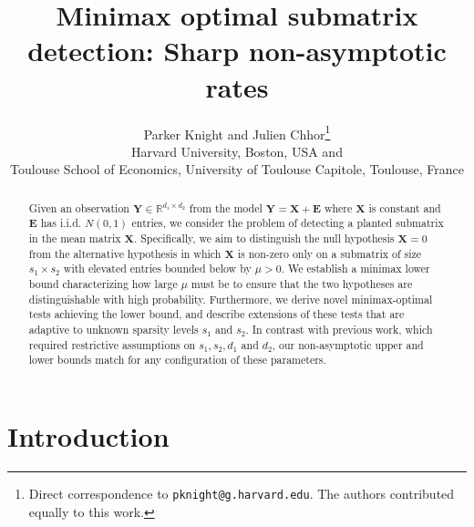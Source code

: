 \documentclass{article}
\title{Minimax optimal submatrix detection: Sharp non-asymptotic rates}
\author{%
  Parker Knight and Julien Chhor\footnote{Direct correspondence to \texttt{pknight@g.harvard.edu}. The authors contributed equally to this work.}  \\
Harvard University, Boston, USA and \\ Toulouse School of Economics, University of Toulouse Capitole, Toulouse, France
}
\newcommand{\R}{\mathbb{R}}
\theoremstyle{remark}
\begin{document}
\maketitle

\begin{abstract}
  Given an observation $\mathbf Y \in \R^{d_1\times d_2}$ from the model $\mathbf Y = \mathbf X + \mathbf E$ where $\mathbf X$ is constant and $\mathbf E$ has i.i.d. $N(0,1)$ entries, we consider the problem of detecting a planted submatrix in the mean matrix $\mathbf X$. Specifically, we aim to distinguish the null hypothesis $\mathbf X = 0$ from the alternative hypothesis in which $\mathbf X$ is non-zero only on a submatrix of size $s_1 \times s_2$ with elevated entries bounded below by $\mu>0$.
  We establish a minimax lower bound characterizing how large $\mu$ must be to ensure that the two hypotheses are distinguishable with high probability. 
  Furthermore, we derive novel minimax-optimal tests achieving the lower bound, and describe extensions of these tests that are adaptive to unknown sparsity levels $s_1$ and $s_2$. 
  In contrast with previous work, which required restrictive assumptions on $s_1,s_2, d_1$ and $d_2$, our non-asymptotic upper and lower bounds match for any configuration of these parameters.
  
\end{abstract}


\section{Introduction}\label{sec:intro}
\end{document}
